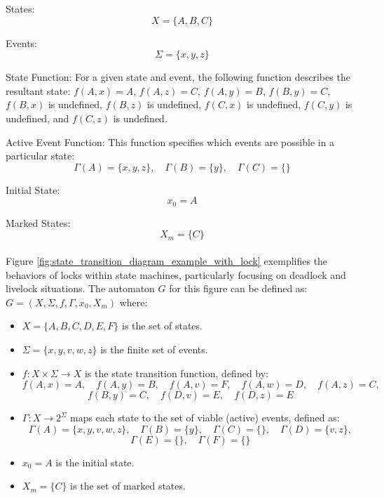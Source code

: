 \noindent
States:
$$
X=\{A, B, C\}
$$

\noindent
Events:
$$
\Sigma=\{x, y, z\}
$$

\noindent
State Function:
For a given state and event, the following function describes the resultant state: \(f(A, x) = A\), \(f(A, z) = C\), \(f(A, y) = B\), \(f(B, y) = C\), \(f(B, x)\) is undefined, \(f(B, z)\) is undefined, \(f(C, x)\) is undefined, \(f(C, y)\) is undefined, and \(f(C, z)\) is undefined.


\noindent
Active Event Function:
This function specifies which events are possible in a particular state:
\[
\Gamma(A) = \{x, y, z\}, \quad \Gamma(B) = \{y\}, \quad \Gamma(C) = \{\}
\]

\noindent
Initial State:
$$
x_0=A
$$

\noindent
Marked States:
$$
X_m=\{C\}
$$

\paragraph{} Figure \ref{fig:state_transition_diagram_example_with_lock} exemplifies the behaviors of locks within state machines, particularly focusing on deadlock and livelock situations. The automaton \(G\) for this figure can be defined as: $G = \left(X, \Sigma, f, \Gamma, x_0, X_m\right)$ where:

\begin{itemize}
  \item \(X = \{A, B, C, D, E, F\}\) is the set of states.
  \item \(\Sigma = \{x, y, v, w, z\}\) is the finite set of events.
  \item \(f: X \times \Sigma \rightarrow X\) is the state transition function, defined by:
  \[
  f(A, x) = A, \quad f(A, y) = B, \quad f(A, v) = F, \quad f(A, w) = D, \quad f(A, z) = C,
  \]
  \[
  f(B, y) = C, \quad f(D, v) = E, \quad f(D, z) = E
  \]
  \item \(\Gamma: X \rightarrow 2^{\Sigma}\) maps each state to the set of viable (active) events, defined as:
  \[
  \Gamma(A) = \{x, y, v, w, z\}, \quad \Gamma(B) = \{y\}, \quad \Gamma(C) = \{\}, \quad \Gamma(D) = \{v, z\},
  \]
  \[
  \Gamma(E) = \{\}, \quad \Gamma(F) = \{\}
  \]
  \item \(x_0 = A\) is the initial state.
  \item \(X_m = \{C\}\) is the set of marked states.
\end{itemize}


